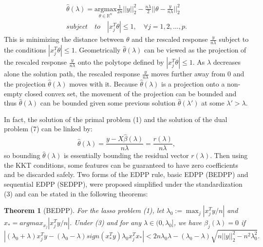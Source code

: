 \documentclass{article}
\newtheorem{theorem}{Theorem}[section]
\begin{document}
\begin{equation}
    \begin{split}
        \hat{\theta}(\lambda) = \underset{\theta\in \mathbb{R}^n}{\mathrm{argmax}}\frac{1}{2n}||y||_2^2-\frac{n\lambda}{2}||\theta-\frac{y}{n\lambda}||_2^2\\
        subject\quad to\quad |x_j^T\theta|\leq 1,\quad \forall j=1,2,...,p.
    \end{split}
\end{equation}
This is minimizing the distance between $\theta$ and the rescaled response $\frac{y}{n\lambda}$ subject to the conditions $|x_j^T\theta|\leq 1$. Geometrically $\hat{\theta}(\lambda)$ can be viewed as the projection of the rescaled response $\frac{y}{n\lambda}$ onto the polytope defined by $|x_j^T\theta|\leq 1$. As $\lambda$ decreases alone the solution path, the rescaled response $\frac{y}{n\lambda}$ moves further away from 0 and the projection $\hat{\theta}(\lambda)$ moves with it. Because $\hat{\theta}(\lambda)$ is a projection onto a non-empty closed convex set, the movement of the projection can be bounded and thus $\hat{\theta}(\lambda)$ can be bounded given some previous solution $\hat{\theta}(\lambda')$ at some $\lambda'>\lambda$.

In fact, the solution of the primal problem (1) and the solution of the dual problem (7) can be linked by:
\begin{equation}
    \hat{\theta}(\lambda)=\frac{y-X\hat{\beta}(\lambda)}{n\lambda}=\frac{r(\lambda)}{n\lambda},
\end{equation}
so bounding $\hat{\theta}(\lambda)$ is essentially bounding the residual vector $r(\lambda)$. Then using the KKT conditions, some features can be guaranteed to have zero coefficients and be discarded safely. Two forms of the EDPP rule, basic EDPP (BEDPP) and sequential EDPP (SEDPP), were proposed\cite{wang2013lasso} simplified\cite{zeng2017efficient} under the standardization (3) and can be stated in the following theorems:

\begin{theorem}[BEDPP]
    For the lasso problem (1), let $\lambda_0:=\max_j|x_j^Ty/n|$ and $x_*=argmax_{x_j}|x_j^Ty/n|$. Under (3) and for any $\lambda\in(0,\lambda_0]$, we have $\hat{\beta}_j(\lambda)=0$ if
    \begin{equation}
        |(\lambda_0+\lambda)x_j^Ty-(\lambda_0-\lambda)sign(x_*^Ty)\lambda_0x_j^Tx_*|<2n\lambda_0\lambda-(\lambda_0-\lambda)\sqrt{n||y||_2^2-n^2\lambda_0^2}.
    \end{equation}
\end{theorem}
\end{document}
